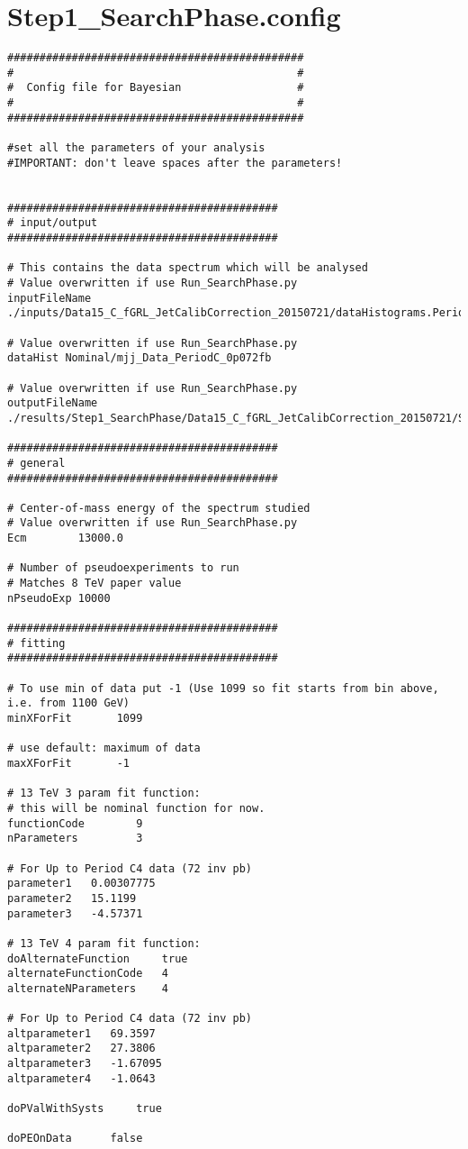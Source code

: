 \documentclass[UKenglish]{latex/atlasdoc}
\begin{document}
\section{Step1\_SearchPhase.config }
\label{app:searchconfig}

\begin{verbatim}
##############################################
#                                            #
#  Config file for Bayesian                  #
#                                            #
##############################################

#set all the parameters of your analysis
#IMPORTANT: don't leave spaces after the parameters!

	
##########################################
# input/output
##########################################

# This contains the data spectrum which will be analysed
# Value overwritten if use Run_SearchPhase.py
inputFileName ./inputs/Data15_C_fGRL_JetCalibCorrection_20150721/dataHistograms.PeriodC.root

# Value overwritten if use Run_SearchPhase.py
dataHist Nominal/mjj_Data_PeriodC_0p072fb

# Value overwritten if use Run_SearchPhase.py
outputFileName ./results/Step1_SearchPhase/Data15_C_fGRL_JetCalibCorrection_20150721/Step1_SearchPhase_mjj_Data_PeriodC_0p072fb.root

##########################################
# general
##########################################

# Center-of-mass energy of the spectrum studied
# Value overwritten if use Run_SearchPhase.py
Ecm        13000.0 

# Number of pseudoexperiments to run
# Matches 8 TeV paper value
nPseudoExp 10000

##########################################
# fitting
##########################################

# To use min of data put -1 (Use 1099 so fit starts from bin above, i.e. from 1100 GeV)
minXForFit       1099 

# use default: maximum of data
maxXForFit       -1   

# 13 TeV 3 param fit function:
# this will be nominal function for now.
functionCode		9
nParameters 		3

# For Up to Period C4 data (72 inv pb)
parameter1   0.00307775 
parameter2   15.1199 
parameter3   -4.57371 

# 13 TeV 4 param fit function:
doAlternateFunction     true
alternateFunctionCode	4
alternateNParameters	4

# For Up to Period C4 data (72 inv pb)
altparameter1   69.3597
altparameter2   27.3806
altparameter3   -1.67095
altparameter4   -1.0643

doPValWithSysts		true

doPEOnData		false\end{verbatim}
\end{document}
